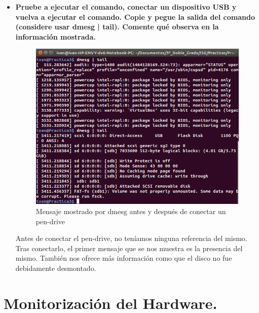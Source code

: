 \begin{itemize}
	\item \textbf{Pruebe a ejecutar el comando, conectar un dispositivo USB y vuelva a
		ejecutar el comando. Copie y pegue la salida del comando (considere usar dmesg |
		tail). Comente qué observa en la información mostrada.}\\
	
	\begin{figure}[H]
	\centering
	\includegraphics[width=0.7\linewidth]{dmesgPenDrive}
	\caption[dmesg]{Mensaje mostrado por dmesg antes y después de conectar un pen-drive}
	\label{fig:dmesgPenDrive}
	\end{figure}
	
	Antes de conectar el pen-drive, no teníamos ninguna referencia del mismo. Tras conectarlo, el primer mensaje que se nos muestra es la presencia del mismo. También nos ofrece más información como que el disco no fue debidamente desmontado.

	
\end{itemize}

\section{Monitorización del Hardware.}

